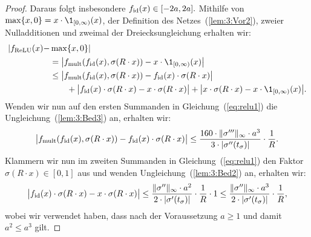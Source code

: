 \begin{proof}
Daraus folgt insbesondere $f_{\mathrm{id}}(x) \in [-2a, 2a].$
Mithilfe von $\max\{x, 0 \} = x \cdot \1_{[0, \infty)}(x)$, der Definition des Netzes~(\ref{lem:3:Vor2}), zweier Nulladditionen und zweimal der Dreiecksungleichung erhalten wir:
\begin{equation}
\label{eq:relu1}
\begin{split}
|f_{\ReLU}(x) - & \max\{x, 0\}|  \\
& = \big| f_{\mult}(f_{\id}(x), \sigma(R \cdot x)) - x \cdot \1_{[0, \infty)}(x)\big| \\
& \leq \big| f_{\mult}(f_{\id}(x), \sigma(R \cdot x)) - f_{\id}(x)\cdot\sigma(R \cdot x)\big| \\
& \qquad + \big| f_{\id}(x)\cdot\sigma(R \cdot x) - x \cdot \sigma(R \cdot x)\big| + \big| x \cdot \sigma(R \cdot x) - x \cdot \1_{[0, \infty)}(x)\big|. 
\end{split}
\end{equation}
Wenden wir nun auf den ersten Summanden in Gleichung~(\ref{eq:relu1}) die Ungleichung~(\ref{lem:3:Bed3}) an, erhalten wir:
\begin{equation}
\label{eq:relu2}
\big| f_{\mathrm{mult}}(f_{\mathrm{id}}(x), \sigma(R \cdot x)) - f_{\mathrm{id}}(x)\cdot\sigma(R \cdot x)\big| \leq \frac{160 \cdot \|\sigma'''\|_{\infty} \cdot a ^3}{3 \cdot |\sigma''(t_{\sigma})|} \cdot \frac{1}{R}.
\end{equation}
Klammern wir nun im zweiten Summanden in Gleichung~(\ref{eq:relu1}) den Faktor $\sigma(R \cdot x) \in [0, 1]$ aus und wenden Ungleichung~(\ref{lem:3:Bed2}) an, erhalten wir:
\begin{equation}
\label{eq:relu3}
\big| f_{\mathrm{id}}(x)\cdot\sigma(R \cdot x) - x \cdot \sigma(R \cdot x)\big| \leq \frac{\|\sigma''\|_{\infty} \cdot a^2}{2 \cdot |\sigma'(t_{\sigma})|} \cdot \frac{1}{R} \cdot 1 \leq \frac{\|\sigma''\|_{\infty} \cdot a^3}{2 \cdot |\sigma'(t_{\sigma})|} \cdot \frac{1}{R},
\end{equation}
wobei wir verwendet haben, dass nach der Voraussetzung $a \geq 1$ und damit $a^2 \leq a^3$ gilt.


\end{proof}
